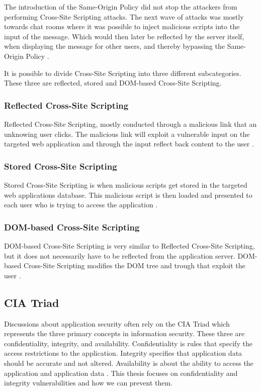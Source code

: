 The introduction of the Same-Origin Policy did not stop the attackers from performing Cross-Site Scripting attacks. The next wave of attacks was mostly towards chat rooms where it was possible to inject malicious scripts into the input of the message. Which would then later be reflected by the server itself, when displaying the message for other users, and thereby bypassing the Same-Origin Policy \parencite{FogieSeth2007Xacs}.

It is possible to divide Cross-Site Scripting into three different subcategories. These three are reflected, stored and DOM-based Cross-Site Scripting.



\subsubsection{Reflected Cross-Site Scripting}
Reflected Cross-Site Scripting, mostly conducted through a malicious link that an unknowing user clicks. The malicious link will exploit a vulnerable input on the targeted web application and through the input reflect back content to the user \parencite{Secure_Web}.



\subsubsection{Stored Cross-Site Scripting}
Stored Cross-Site Scripting is when malicious scripts get stored in the targeted web applications database. This malicious script is then loaded and presented to each user who is trying to access the application \parencite{Secure_Web}.



\subsubsection{DOM-based Cross-Site Scripting}
DOM-based Cross-Site Scripting is very similar to Reflected Cross-Site Scripting, but it does not necessarily have to be reflected from the application server. DOM-based Cross-Site Scripting modifies the DOM tree and trough that exploit the user \parencite{Secure_Web}.



\subsection{CIA Triad}
Discussions about application security often rely on the CIA Triad which represents the three primary concepts in information security. These three are confidentiality, integrity, and availability. Confidentiality is rules that specify the access restrictions to the application. Integrity specifies that application data should be accurate and not altered. Availability is about the ability to access the application and application data \parencite{2014C1-W}. This thesis focuses on confidentiality and integrity vulnerabilities and how we can prevent them.

